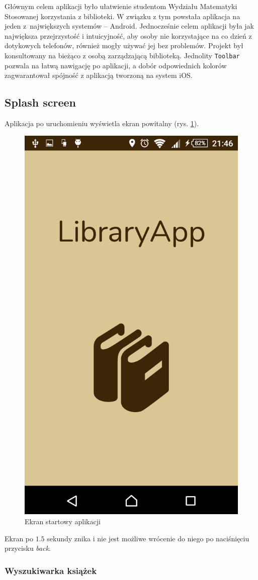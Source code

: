 \documentclass[twoside]{projektInzynierskiMS}
\begin{document}
Głównym celem aplikacji było ułatwienie studentom Wydziału Matematyki Stosowanej korzystania z biblioteki. W związku z tym powstała aplikacja na jeden z~największych systemów -- Android. Jednocześnie celem aplikacji była jak największa przejrzystość i intuicyjność, aby osoby nie korzystające na co dzień z dotykowych telefonów, również mogły używać jej bez problemów. Projekt był konsultowany na bieżąco z osobą zarządzającą biblioteką. Jednolity \verb`Toolbar` pozwala na łatwą nawigację po aplikacji, a dobór odpowiednich kolorów zagwarantował spójność z aplikacją tworzoną na system iOS.
 
\subsection{Splash screen}

Aplikacja po uruchomieniu wyświetla ekran powitalny (rys. \ref{fig:splashScreen}). 

\begin{figure}[h]
  \centering
  \includegraphics[width=0.4\linewidth]{img/android/android1.png}
  \caption{Ekran startowy aplikacji}
  \label{fig:splashScreen}
\end{figure}

Ekran po $1.5$ sekundy znika i nie jest możliwe wrócenie do niego po naciśnięciu przycisku \textit{back}.

\subsubsection{Wyszukiwarka książek}
\end{document}
